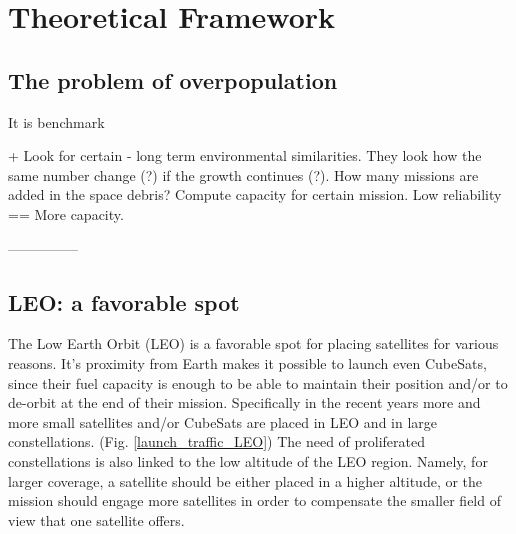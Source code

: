 \chapter{Theoretical Framework}
\label{chap:2}

\section{The problem of overpopulation}
\bigskip

It is benchmark 


+ Look for certain - long term environmental similarities. They look how the same number change (?) if the growth continues (?). How many missions are added in the space debris? Compute capacity for certain mission. Low reliability  == More capacity.


---------------

\section{LEO: a favorable spot}
\bigskip

The Low Earth Orbit (LEO) is a favorable spot for placing satellites for various reasons. It's proximity from Earth makes it possible to launch even CubeSats, since their fuel capacity is enough to be able to maintain their position and/or to de-orbit at the end of their mission. Specifically in the recent years more and more small satellites and/or CubeSats are placed in LEO and in large constellations. (Fig. \ref{launch_traffic_LEO}) The need of proliferated constellations is also linked to the low altitude of the LEO region. Namely, for larger coverage, a satellite should be either placed in a higher altitude, or the mission should engage more satellites in order to compensate the smaller field of view that one satellite offers.

